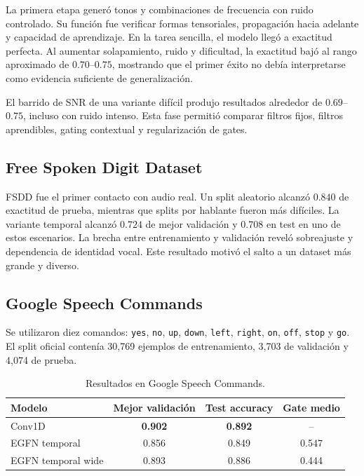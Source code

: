 \documentclass[11pt,a4paper]{article}
\begin{document}
La primera etapa generó tonos y combinaciones de frecuencia con ruido
controlado. Su función fue verificar formas tensoriales, propagación hacia
adelante y capacidad de aprendizaje. En la tarea sencilla, el modelo llegó a
exactitud perfecta. Al aumentar solapamiento, ruido y dificultad, la exactitud
bajó al rango aproximado de \(0.70\)--\(0.75\), mostrando que el primer éxito no
debía interpretarse como evidencia suficiente de generalización.

El barrido de SNR de una variante difícil produjo resultados alrededor de
\(0.69\)--\(0.75\), incluso con ruido intenso. Esta fase permitió comparar
filtros fijos, filtros aprendibles, gating contextual y regularización de gates.

\subsection{Free Spoken Digit Dataset}

FSDD fue el primer contacto con audio real. Un split aleatorio alcanzó
\(0.840\) de exactitud de prueba, mientras que splits por hablante fueron más
difíciles. La variante temporal alcanzó \(0.724\) de mejor validación y
\(0.708\) en test en uno de estos escenarios. La brecha entre entrenamiento y
validación reveló sobreajuste y dependencia de identidad vocal. Este resultado
motivó el salto a un dataset más grande y diverso.

\subsection{Google Speech Commands}

Se utilizaron diez comandos: \texttt{yes}, \texttt{no}, \texttt{up},
\texttt{down}, \texttt{left}, \texttt{right}, \texttt{on}, \texttt{off},
\texttt{stop} y \texttt{go}. El split oficial contenía 30,769 ejemplos de
entrenamiento, 3,703 de validación y 4,074 de prueba.

\begin{table}[ht]
\centering
\caption{Resultados en Google Speech Commands.}
\label{tab:speech}
\begin{tabular}{lccc}
\toprule
Modelo & Mejor validación & Test accuracy & Gate medio \\
\midrule
Conv1D & \textbf{0.902} & \textbf{0.892} & -- \\
EGFN temporal & 0.856 & 0.849 & 0.547 \\
EGFN temporal wide & 0.893 & 0.886 & 0.444 \\
\bottomrule
\end{tabular}
\end{table}
\end{document}
